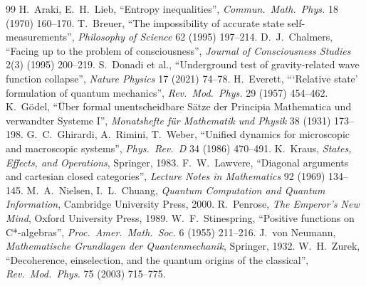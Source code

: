 \documentclass[a4paper,11pt]{article}
\theoremstyle{definition}
\begin{document}
\begin{thebibliography}{99}
 H.~Araki, E.~H.~Lieb, ``Entropy inequalities'', \emph{Commun.\ Math.\ Phys.} 18 (1970) 160--170.
 T.~Breuer, ``The impossibility of accurate state self-measurements'', \emph{Philosophy of Science} 62 (1995) 197--214.
 D.~J.~Chalmers, ``Facing up to the problem of consciousness'', \emph{Journal of Consciousness Studies} 2(3) (1995) 200--219.
 S.~Donadi et al., ``Underground test of gravity-related wave function collapse'', \emph{Nature Physics} 17 (2021) 74--78.
 H.~Everett, ```Relative state' formulation of quantum mechanics'', \emph{Rev.\ Mod.\ Phys.} 29 (1957) 454--462.
 K.~Gödel, ``Über formal unentscheidbare Sätze der Principia Mathematica und verwandter Systeme I'', \emph{Monatshefte für Mathematik und Physik} 38 (1931) 173--198.
 G.~C.~Ghirardi, A.~Rimini, T.~Weber, ``Unified dynamics for microscopic and macroscopic systems'', \emph{Phys.\ Rev.\ D} 34 (1986) 470--491.
 K.~Kraus, \emph{States, Effects, and Operations}, Springer, 1983.
 F.~W.~Lawvere, ``Diagonal arguments and cartesian closed categories'', \emph{Lecture Notes in Mathematics} 92 (1969) 134--145.
 M.~A.~Nielsen, I.~L.~Chuang, \emph{Quantum Computation and Quantum Information}, Cambridge University Press, 2000.
 R.~Penrose, \emph{The Emperor's New Mind}, Oxford University Press, 1989.
 W.~F.~Stinespring, ``Positive functions on C*-algebras'', \emph{Proc.\ Amer.\ Math.\ Soc.} 6 (1955) 211--216.
 J.~von Neumann, \emph{Mathematische Grundlagen der Quantenmechanik}, Springer, 1932.
 W.~H.~Zurek, ``Decoherence, einselection, and the quantum origins of the classical'', \emph{Rev.\ Mod.\ Phys.} 75 (2003) 715--775.
\end{thebibliography}
\end{document}

